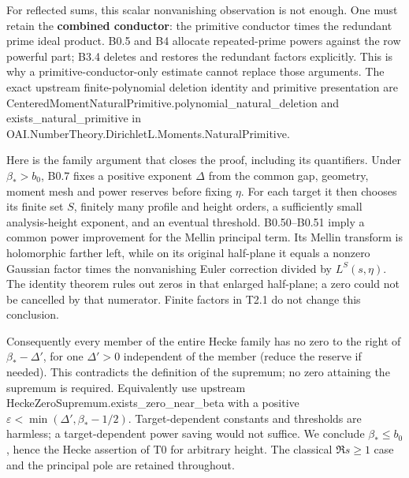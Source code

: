 \documentclass[11pt,a4paper]{article}
\newcommand{\sourcecode}[1]{{\small\ttfamily #1}}
\begin{document}
For reflected sums, this scalar nonvanishing observation is not enough.
One must retain the \textbf{combined conductor}: the primitive conductor
times the redundant prime ideal product. B0.5 and B4 allocate
repeated-prime powers against the row powerful part; B3.4 deletes and
restores the redundant factors explicitly. This is why a
primitive-conductor-only estimate cannot replace those arguments. The
exact upstream finite-polynomial deletion identity and primitive
presentation are
\sourcecode{Centered\allowbreak{}Moment\allowbreak{}Natural\allowbreak{}Primitive.\allowbreak{}polynomial\_\allowbreak{}natural\_\allowbreak{}deletion}
and \sourcecode{exists\_\allowbreak{}natural\_\allowbreak{}primitive} in
\sourcecode{OAI.\allowbreak{}Number\allowbreak{}Theory.\allowbreak{}Dirichlet\allowbreak{}L.\allowbreak{}Moments.\allowbreak{}Natural\allowbreak{}Primitive}.

Here is the family argument that closes the proof, including its
quantifiers. Under \(\beta_*>b_0\), B0.7 fixes a positive exponent
\(\Delta\) from the common gap, geometry, moment mesh and power reserves
before fixing \(\eta\). For each target it then chooses its finite set
\(S\), finitely many profile and height orders, a sufficiently small
analysis-height exponent, and an eventual threshold. B0.50--B0.51 imply
a common power improvement for the Mellin principal term. Its Mellin
transform is holomorphic farther left, while on its original half-plane
it equals a nonzero Gaussian factor times the nonvanishing Euler
correction divided by \(L^S(s,\allowbreak{}\eta)\). The identity theorem rules out
zeros in that enlarged half-plane; a zero could not be cancelled by that
numerator. Finite factors in T2.1 do not change this conclusion.

Consequently every member of the entire Hecke family has no zero to the
right of \(\beta_*-\Delta'\), for one \(\Delta'>0\) independent of the
member (reduce the reserve if needed). This contradicts the definition
of the supremum; no zero attaining the supremum is required.
Equivalently use upstream
\sourcecode{Hecke\allowbreak{}Zero\allowbreak{}Supremum.\allowbreak{}exists\_\allowbreak{}zero\_\allowbreak{}near\_\allowbreak{}beta} with a positive
\(\varepsilon<\min(\Delta',\allowbreak{}\beta_*-1/2)\). Target-dependent constants
and thresholds are harmless; a target-dependent power saving would not
suffice. We conclude \(\beta_*\le b_0\), hence the Hecke assertion of T0
for arbitrary height. The classical \(\Re s\ge1\) case and the principal
pole are retained throughout.
\end{document}
